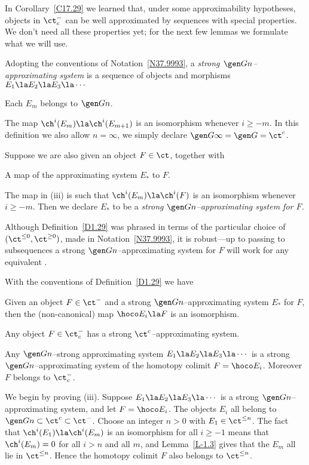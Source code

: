 \documentclass[11pt]{amsart}
\begin{document}
\nin
In
Corollary~\ref{C17.29} we learned that, under some
approximability hypotheses, objects in $\ct^-_c$
can be well approximated by sequences with special properties.
We don't need all these properties yet; for the
next few lemmas we formulate
what we will use.


Adopting the conventions of Notation~\ref{N37.9993},
a \emph{strong $\gen Gn$--approximating system} is
a sequence of objects and morphisms $E_1\la E_2\la E_3\la\cdots$
\be
\item
  Each $E_m$ belongs to $\gen Gn$.
\item
The map $\ch^i(E_m)\la\ch^i(E_{m+1})$ is an isomorphism whenever $i\geq-m$.
\setcounter{enumiv}{\value{enumi}}
\ee
In this definition we also allow $n=\infty$, we
simply declare $\gen G\infty=\gen G{}=\ct^c$.

Suppose we are also given an object $F\in\ct$, together with
\be
\setcounter{enumi}{\value{enumiv}}
\item
A map of
the approximating system $E_*$ to $F$.
\item
The map in (iii) is such that
$\ch^i(E_m)\la\ch^i(F)$ is an isomorphism whenever $i\geq-m$.
\ee 
Then we declare $E_*$ to be a
\emph{strong $\gen Gn$--approximating system for $F$.}
\edfn


Although Definition~\ref{D1.29} was phrased
in terms of the particular choice
of \tstr\ 
$(\ct^{\leq0},\ct^{\geq0})$, made in Notation~\ref{N37.9993},
it is robust---up to passing to subsequences
a
strong $\gen Gn$--approximating system for $F$ will work for
any equivalent \tstr.
\ermk



With the conventions of Definition~\ref{D1.29} we have
\be
\item
Given an object $F\in\ct^-$ and a strong $\gen Gn$--approximating
system $E_*$ for $F$, then the (non-canonical) map $\hoco E_i\la F$
is an isomorphism.
\item
Any object $F\in\ct^-_c$ has a strong $\ct^c$--approximating
system.
\item
Any $\gen Gn$--strong approximating system
$E_1\la E_2\la E_3\la\cdots$ is a
strong $\gen Gn$--approximating system of the
homotopy colimit $F=\hoco E_i$. Moreover
$F$ belongs to $\ct^-_c$.
\ee 
\elem

\prf
We begin by proving (iii).
Suppose $E_1\la E_2\la E_3\la\cdots$ is a strong $\gen Gn$--approximating
system, and let $F=\hoco E_i$. The objects $E_i$ all belong to
$\gen Gn\subset\ct^c\subset\ct^-$. Choose an integer $n>0$ with
$E_1\in\ct^{\leq n}$. The fact that $\ch^i(E_1)\la\ch^i(E_m)$ is an isomorphism
for all $i\geq-1$ means that $\ch^i(E_m)=0$ for all $i>n$ and all $m$,
and Lemma~\ref{L-1.3} gives that the
$E_m$ all lie in $\ct^{\leq n}$. Hence the homotopy
colimit $F$ also belongs to $\ct^{\leq n}$.
\end{document}
